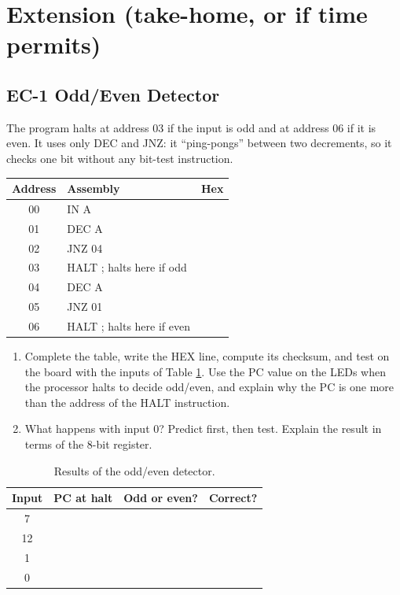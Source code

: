 \documentclass{article}
\begin{document}
\section*{Extension (take-home, or if time permits)}
\subsection*{EC-1 Odd/Even Detector}
\noindent The program halts at address 03 if the input is odd and at address 06 if it is even. It uses only DEC and JNZ: it ``ping-pongs'' between two decrements, so it checks one bit without any bit-test instruction.

\begin{center}
\begin{tabular}{|c|l|c|}
    \hline
    \textbf{Address} & \textbf{Assembly} & \textbf{Hex} \\
    \hline
    00 & IN A & \\ \hline
    01 & DEC A & \\ \hline
    02 & JNZ 04 & \\ \hline
    03 & HALT \quad ; halts here if odd & \\ \hline
    04 & DEC A & \\ \hline
    05 & JNZ 01 & \\ \hline
    06 & HALT \quad ; halts here if even & \\ \hline
\end{tabular}
\end{center}

\begin{enumerate}
    \item Complete the table, write the HEX line, compute its checksum, and test on the board with the inputs of Table \ref{tab:parity11}. Use the PC value on the LEDs when the processor halts to decide odd/even, and explain why the PC is one more than the address of the HALT instruction.
    \item What happens with input $0$? Predict first, then test. Explain the result in terms of the 8-bit register.
\end{enumerate}

\begin{table}[H]
    \centering
    \begin{tabular}{|c|c|c|c|}
        \hline
        \textbf{Input} & \textbf{PC at halt} & \textbf{Odd or even?} & \textbf{Correct?} \\
        \hline
        7 & & & \\ \hline
        12 & & & \\ \hline
        1 & & & \\ \hline
        0 & & & \\ \hline
    \end{tabular}
    \caption{Results of the odd/even detector.}
    \label{tab:parity11}
\end{table}
\end{document}
